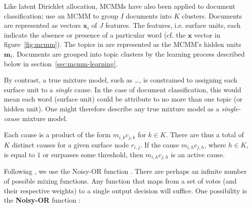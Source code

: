 Like latent Dirichlet allocation, MCMMs have also been applied to document classification; \cite{sahami-et-al:96} 
use an \ac{MCMM} to group $I$ documents into $K$ clusters.  Documents are 
represented as vectors $\mathbf{x}_i$ of $J$ features. The features, i.e. surface units, 
each indicate the absence or presence of a particular word (cf. the $\mathbf{x}$ 
vector in figure~\ref{fig:mcmm}). The topics in \cite{sahami-et-al:96} are represented 
as the MCMM's hidden units $\mathbf{m}_i$. Documents are grouped into topic 
clusters by the learning process described below in section~\ref{sec:mcmm-learning}.

By contrast, a true mixture model, such as \dots, is constrained to assigning each surface 
unit to a \emph{single} cause. In the case of 
document classification, this would mean each word (surface unit) could be attribute to no more than
one topic (or hidden unit). One might therefore describe any true
mixture model as a \emph{single-cause} mixture model. 

Each cause is a product of the form $m_{i,k} c_{j,k}$ for $k \in K$.
There are thus a total of $K$ distinct causes for a given surface node $r_{i,j}$. 
If the cause $m_{i,h} c_{j,h}$, where $h \in K$, is equal to $1$ or surpasses some
threshold, then $m_{i,h} c_{j,h}$ is an active cause.

Following \cite{saund:94}, we use the Noisy-OR function \citep{pearl:1988}.
There are perhaps an infinite number of possible mixing functions. 
Any function that maps from a set of votes 
(and their respective weights) to a single output decision will suffice.
One possibility is the \textbf{Noisy-OR} function \citep{pearl:1988}:
 
